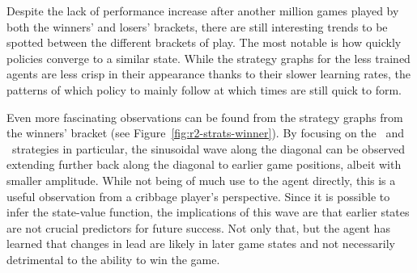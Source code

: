 


Despite the lack of performance increase after another million games played by
both the winners' and losers' brackets,
there are still interesting trends to be spotted between the different brackets
of play.
%
The most notable is how quickly policies converge to a similar state.
%
While the strategy graphs for the less trained agents are less crisp
in their appearance thanks to their slower learning rates,
the patterns of which policy to mainly follow at which times
are still quick to form.

Even more fascinating observations can be found from the strategy graphs
from the winners' bracket (see Figure~\ref{fig:r2-strats-winner}).
%
By focusing on the \handmaxmin\ and \handmaxavg\ strategies in particular,
the sinusoidal wave along the diagonal can be observed extending further
back along the diagonal to earlier game positions,
albeit with smaller amplitude.
%
While not being of much use to the agent directly,
this is a useful observation from a cribbage player's perspective.
%
Since it is possible to infer the state-value function,
the implications of this wave are that earlier states are not crucial
predictors for future success.
%
Not only that,
but the agent has learned that changes in lead are likely in later game states
and not necessarily detrimental to the ability to win the game.






